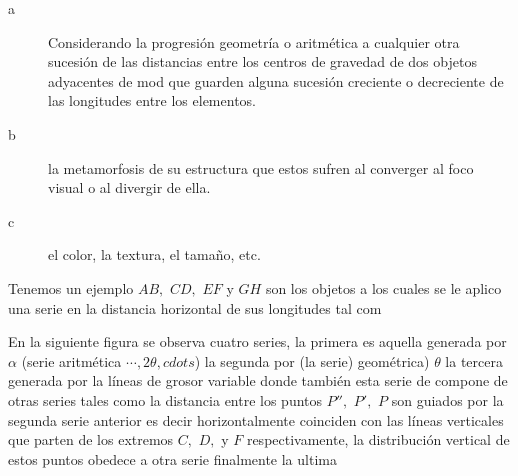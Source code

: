 \begin{description}
  \item[a] Considerando  la progresión geometría o aritmética a cualquier otra sucesión de las distancias entre los centros de gravedad de dos objetos adyacentes de mod que guarden alguna sucesión creciente o decreciente de las longitudes entre los elementos.

  \item[b] la metamorfosis de su estructura que estos sufren al converger al foco visual o al divergir de ella.

  \item[c] el color, la textura, el tamaño, etc.
\end{description}

  Tenemos un ejemplo
$AB,$ $CD,$ $EF$ y $GH$ son los objetos a los cuales se le aplico una serie en la distancia horizontal de sus longitudes tal com


En la siguiente figura se observa cuatro series, la primera es aquella generada por $\alpha$ (serie aritmética $\cdots, 2\theta, cdots$) la segunda por (la serie) geométrica) $\theta$ la tercera generada por la líneas de grosor variable donde también esta serie de compone de otras series tales como la distancia entre los puntos $P'',$ $P',$ $P$ son guiados por la segunda serie anterior es decir horizontalmente coinciden con las líneas  verticales que parten de los extremos $C,$ $D,$ y $F$ respectivamente, la distribución vertical de estos puntos  obedece a otra serie finalmente la ultima

